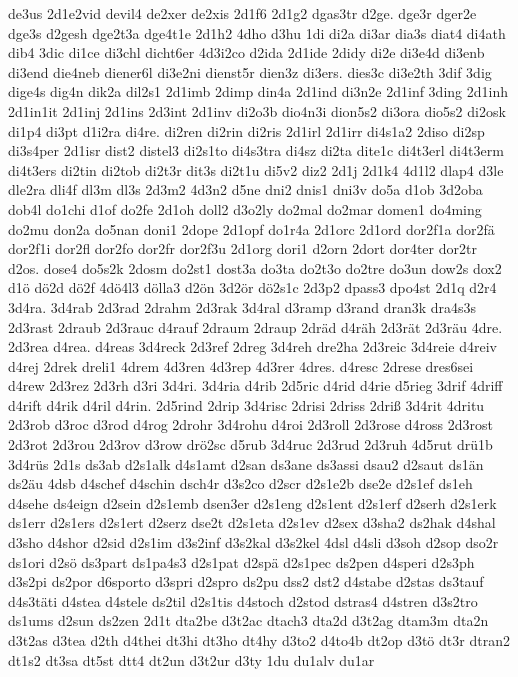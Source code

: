 {de3us
2d1e2vid
devil4
de2xer
de2xis
2d1f6
2d1g2
dgas3tr
d2ge.
dge3r
dger2e
dge3s
d2gesh
dge2t3a
dge4t1e
2d1h2
4dho
d3hu
1di
di2a
di3ar
dia3s
diat4
di4ath
dib4
3dic
di1ce
di3chl
dicht6er
4d3i2co
d2ida
2d1ide
2didy
di2e
di3e4d
di3enb
di3end
die4neb
diener6l
di3e2ni
dienst5r
dien3z
di3ers.
dies3c
di3e2th
3dif
3dig
dige4s
dig4n
dik2a
dil2s1
2d1imb
2dimp
din4a
2d1ind
di3n2e
2d1inf
3ding
2d1inh
2d1in1it
2d1inj
2d1ins
2d3int
2d1inv
di2o3b
dio4n3i
dion5s2
di3ora
dio5s2
di2osk
di1p4
di3pt
d1i2ra
di4re.
di2ren
di2rin
di2ris
2d1irl
2d1irr
di4s1a2
2diso
di2sp
di3s4per
2d1isr
dist2
distel3
di2s1to
di4s3tra
di4sz
di2ta
dite1c
di4t3erl
di4t3erm
di4t3ers
di2tin
di2tob
di2t3r
dit3s
di2t1u
di5v2
diz2
2d1j
2d1k4
4d1l2
dlap4
d3le
dle2ra
dli4f
dl3m
dl3s
2d3m2
4d3n2
d5ne
dni2
dnis1
dni3v
do5a
d1ob
3d2oba
dob4l
do1chi
d1of
do2fe
2d1oh
doll2
d3o2ly
do2mal
do2mar
domen1
do4ming
do2mu
don2a
do5nan
doni1
2dope
2d1opf
do1r4a
2d1orc
2d1ord
dor2f1a
dor2fä
dor2f1i
dor2fl
dor2fo
dor2fr
dor2f3u
2d1org
dori1
d2orn
2dort
dor4ter
dor2tr
d2os.
dose4
do5s2k
2dosm
do2st1
dost3a
do3ta
do2t3o
do2tre
do3un
dow2s
dox2
d1ö
dö2d
dö2f
4dö4l3
dölla3
d2ön
3d2ör
dö2s1c
2d3p2
dpass3
dpo4st
2d1q
d2r4
3d4ra.
3d4rab
2d3rad
2drahm
2d3rak
3d4ral
d3ramp
d3rand
dran3k
dra4s3s
2d3rast
2draub
2d3rauc
d4rauf
2draum
2draup
2dräd
d4räh
2d3rät
2d3räu
4dre.
2d3rea
d4rea.
d4reas
3d4reck
2d3ref
2dreg
3d4reh
dre2ha
2d3reic
3d4reie
d4reiv
d4rej
2drek
dreli1
4drem
4d3ren
4d3rep
4d3rer
4dres.
d4resc
2drese
dres6sei
d4rew
2d3rez
2d3rh
d3ri
3d4ri.
3d4ria
d4rib
2d5ric
d4rid
d4rie
d5rieg
3drif
4driff
d4rift
d4rik
d4ril
d4rin.
2d5rind
2drip
3d4risc
2drisi
2driss
2driß
3d4rit
4dritu
2d3rob
d3roc
d3rod
d4rog
2drohr
3d4rohu
d4roi
2d3roll
2d3rose
d4ross
2d3rost
2d3rot
2d3rou
2d3rov
d3row
drö2sc
d5rub
3d4ruc
2d3rud
2d3ruh
4d5rut
drü1b
3d4rüs
2d1s
ds3ab
d2s1alk
d4s1amt
d2san
ds3ane
ds3assi
dsau2
d2saut
ds1än
ds2äu
4dsb
d4schef
d4schin
dsch4r
d3s2co
d2scr
d2s1e2b
dse2e
d2s1ef
ds1eh
d4sehe
ds4eign
d2sein
d2s1emb
dsen3er
d2s1eng
d2s1ent
d2s1erf
d2serh
d2s1erk
ds1err
d2s1ers
d2s1ert
d2serz
dse2t
d2s1eta
d2s1ev
d2sex
d3sha2
ds2hak
d4shal
d3sho
d4shor
d2sid
d2s1im
d3s2inf
d3s2kal
d3s2kel
4dsl
d4sli
d3soh
d2sop
dso2r
ds1ori
d2sö
ds3part
ds1pa4s3
d2s1pat
d2spä
d2s1pec
ds2pen
d4speri
d2s3ph
d3s2pi
ds2por
d6sporto
d3spri
d2spro
ds2pu
dss2
dst2
d4stabe
d2stas
ds3tauf
d4s3täti
d4stea
d4stele
ds2til
d2s1tis
d4stoch
d2stod
dstras4
d4stren
d3s2tro
ds1ums
d2sun
ds2zen
2d1t
dta2be
d3t2ac
dtach3
dta2d
d3t2ag
dtam3m
dta2n
d3t2as
d3tea
d2th
d4thei
dt3hi
dt3ho
dt4hy
d3to2
d4to4b
dt2op
d3tö
dt3r
dtran2
dt1s2
dt3sa
dt5st
dtt4
dt2un
d3t2ur
d3ty
1du
du1alv
du1ar
}
